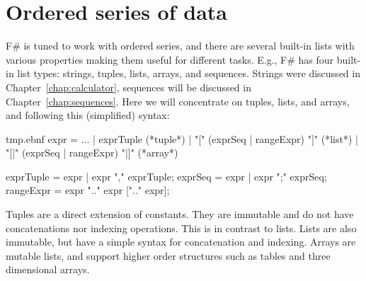 \chapter{Ordered series of data}
\label{chap:lists}
F\# is tuned to work with ordered series, and there are several built-in lists with various properties making them useful for different tasks. E.g.,
%
%
F\# has four built-in list types: strings, tuples, lists, arrays, and sequences. Strings were discussed in Chapter~\ref{chap:calculator}, sequences will be discussed in Chapter~\ref{chap:sequences}. Here we will concentrate on tuples, lists,  and arrays, and following this (simplified) syntax:
%
\begin{verbatimwrite}{tmp.ebnf}
expr = ... 
  | exprTuple (*tuple*)
  | "[" (exprSeq | rangeExpr) "]" (*list*)
  | "[|" (exprSeq | rangeExpr) "|]" (*array*)

exprTuple = expr | expr "," exprTuple;
exprSeq =  expr | expr ";" exprSeq;
rangeExpr = expr ".." expr [".." expr];
\end{verbatimwrite}
%
 Tuples are a direct extension of constants. They are immutable and do not have concatenations nor indexing operations. This is in contrast to lists. Lists are also immutable, but have a simple syntax for concatenation and indexing. Arrays are mutable lists, and support higher order structures such as tables and three dimensional arrays. 

